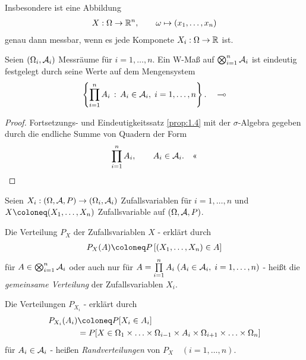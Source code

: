 Insbesondere ist eine Abbildung
\begin{align*}
X: \Omega\to\R^n,\qquad \omega\mapsto (x_1,\ldots,x_n)
\end{align*}
genau dann messbar, wenn es jede Komponete $X_i:\Omega\to \R$ ist.

\begin{bem}
\label{bem:3.4}
Seien $(\Omega _{i}, \AA_{i})$ Messräume für $i=1,\ldots ,n$. Ein W-Maß auf
$\bigotimes^{n}_{i=1} \AA_{i}$ ist eindeutig festgelegt durch seine Werte
auf dem Mengensystem
\begin{align*}
\setdef{\prod\limits^{n}_{i=1} A_{i}}{A_{i}
\in \AA_{i},\;i=1, \ldots ,n}.\maphere
\end{align*}
\end{bem}
\begin{proof}
Fortsetzungs- und Eindeutigkeitssatz \ref{prop:1.4} mit der $\sigma$-Algebra
gegeben durch die endliche Summe von Quadern der Form
\begin{align*}
\prod\limits_{i=1}^n A_i,\qquad A_i\in\AA_i.\qedhere
\end{align*}
\end{proof}

\begin{defn}
\label{defn:3.6}
Seien $X_{i}: (\Omega,\AA,P)\to(\Omega _{i}, \AA_{i})$ Zufallsvariablen für
$i=1, \ldots ,n$ und $X\defl (X_{1},
\ldots, X_{n})$ Zufallsvariable auf $(\Omega, \AA, P)$.

\begin{defnenum}
  \item Die Verteilung $P_{X}$ der Zufallsvariablen $X$  - erklärt durch
\begin{align*}
P_{X} (A) \defl P\left[(X_{1}, \ldots , X_{n}) \in A \right]
\end{align*}
für $A \in \bigotimes^{n}_{i=1} \AA_{i}$ oder auch nur für
$A= \prod\limits^{n}_{i=1} A_{i} \; (A_{i} \in \AA_i, \; i=
1, \ldots ,n)$ - heißt die \emph{gemeinsame Verteilung} der Zufallsvariablen $X_{i}$.
\item
Die Verteilungen ${P_{X_{i}}}$ - erklärt durch
\begin{align*}
P_{X_{i}}(A_{i}) &\defl P[X_{i} \in A_{i}] \\ &= P[X \in \Omega_{1}
\times \ldots \times \Omega _{i-1} \times A_{i} \times \Omega _{i+1} \times
\ldots \times \Omega _{n}]
\end{align*}
für $A_{i} \in \AA_{i}$ - heißen \emph{Randverteilungen} von
$P_{X} \quad (i=1,\ldots , n)$.\fishhere  
\end{defnenum}
\end{defn}

